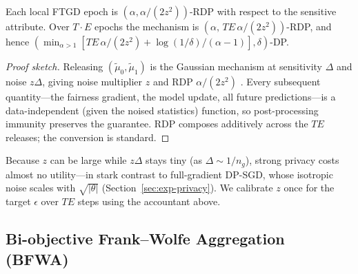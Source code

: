\begin{proposition}
Each local FTGD epoch is $(\alpha,\alpha/(2z^2))$-RDP with respect to the
sensitive attribute. Over $T\!\cdot\!E$ epochs the mechanism is
$(\alpha,\,TE\,\alpha/(2z^2))$-RDP, and hence
$(\min_{\alpha>1}[TE\,\alpha/(2z^2)+\log(1/\delta)/(\alpha-1)],\delta)$-DP.
\end{proposition}
\begin{proof}[Proof sketch]
Releasing $(\tilde{\mu}_0,\tilde{\mu}_1)$ is the Gaussian mechanism at
sensitivity $\Delta$ and noise $z\Delta$, giving noise multiplier $z$ and RDP
$\alpha/(2z^2)$ \cite{mironov2017renyi}. Every subsequent quantity---the
fairness gradient, the model update, all future predictions---is a
data-independent (given the noised statistics) function, so post-processing
immunity preserves the guarantee. RDP composes additively across the $TE$
releases; the conversion is standard.
\end{proof}

Because $z$ can be large while $z\Delta$ stays tiny (as $\Delta\!\sim\!1/n_g$),
strong privacy costs almost no utility---in stark contrast to full-gradient
DP-SGD, whose isotropic noise scales with $\sqrt{|\theta|}$
(Section~\ref{sec:exp-privacy}). We calibrate $z$ once for the target
$\epsilon$ over $TE$ steps using the accountant above.

\subsection{Bi-objective Frank--Wolfe Aggregation (BFWA)}
\label{sec:bfwa}

